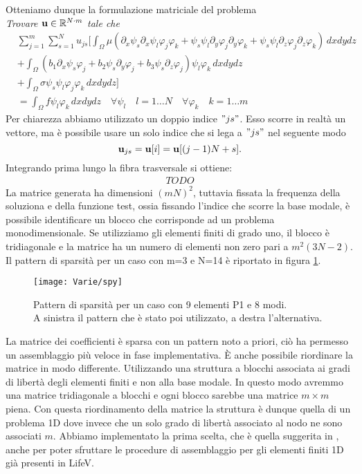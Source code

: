 Otteniamo dunque la formulazione matriciale del problema\\
\emph{Trovare $\mathbf{u} \in \mathbb{R}^{N\cdot m}$ tale che}
\begin{equation*}
\begin{split}
&\sum_{j=1}^m \sum_{s=1}^N
u_{js} \Bigg[ \int_\Omega\mu( \partial_x\psi_s \partial_x\psi_l\varphi _j\varphi _k + \psi_s \psi_l \partial_y\varphi _j\partial_y\varphi _k + \psi_s \psi_l \partial_z\varphi _j\partial_z\varphi _k)\,dxdydz \\
&+ \int_\Omega (b_1\partial_x\psi_s\varphi _j+b_2\psi_s\partial_y\varphi _j + b_3\psi_s\partial_z\varphi_j)\psi_l\varphi _k\,dxdydz\\ 
&+\int_\Omega \sigma\psi_s\psi_l\varphi _j\varphi _k\,dxdydz \Bigg]\\
&=\int_\Omega f\psi_l\varphi _k\,dxdydz\quad \forall \psi_l\quad l=1\ldots N\quad\forall \varphi_k\quad k=1\ldots m
\end{split}
\end{equation*}
Per chiarezza abbiamo utilizzato un doppio indice $"js"$. Esso scorre in realt\`a  un vettore,
ma \`e possibile usare un solo indice che si lega a $"js"$ nel seguente modo
$$\mathbf{u}_{js}=\mathbf{u}[i]=\mathbf{u}[(j-1)N+s].$$ 
Integrando prima lungo la fibra trasversale si ottiene:
\begin{equation*}
\begin{split}
TODO
\end{split}
\end{equation*}
 La matrice generata ha dimensioni $(mN)^2$, tuttavia fissata
 la frequenza della soluziona e della funzione test, ossia fissando l'indice che scorre la base modale,
 \`e possibile identificare un blocco che corrisponde ad un problema monodimensionale.
Se utilizziamo gli elementi finiti di grado uno, il blocco \`e tridiagonale e
 la matrice ha un numero di elementi non zero pari a $m^2(3N-2)$. 
 Il pattern di sparsit\`a per un caso con m=3 e N=14 \`e riportato in figura \ref{fig:pattern}.
 \begin{figure}[!h]
    \centering
    \texttt{[image: Varie/spy]}
    \caption{Pattern di sparsit\`a per un caso con 9 elementi P1 e 8 modi.\\A sinistra il pattern che \`e stato poi utilizzato, a destra l'alternativa.}
    \label{fig:pattern}
\end{figure}
La matrice dei coefficienti \`e sparsa con un pattern noto a priori, ci\`o ha permesso 
 un assemblaggio pi\`u veloce in fase implementativa.
 \`E anche possibile riordinare la matrice in modo differente. Utilizzando una struttura 
 a blocchi associata ai gradi di libert\`a degli elementi finiti e non alla base modale.
 In questo modo avremmo una matrice tridiagonale a blocchi e ogni blocco sarebbe una matrice
 $m\times m$ piena. Con questa riordinamento della matrice la struttura \`e dunque quella 
 di un problema 1D dove invece che un solo grado di libert\`a associato al nodo ne sono associati $m$.
 Abbiamo implementato la prima scelta, che \`e quella suggerita in
 \cite{perotto:2008}, anche per poter sfruttare le procedure di assemblaggio 
 per gli elementi finiti 1D gi\`a presenti in LifeV.
\clearpage


